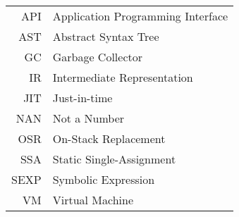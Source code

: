 \documentclass[english,master,oneside]{ctufit-thesis}
\begin{document}
\chapter{\thectufitabbreviationlabel}

\begin{tabular}{rl}
	API  & Application Programming Interface \\
	AST  & Abstract Syntax Tree              \\
	GC   & Garbage Collector                 \\
	IR   & Intermediate Representation       \\
	JIT  & Just-in-time                      \\
	NAN  & Not a Number                      \\
	OSR  & On-Stack Replacement              \\
	SSA  & Static Single-Assignment          \\
	SEXP & Symbolic Expression               \\
	VM   & Virtual Machine                   \\
\end{tabular}


\resumeTOCentries
\mainmatter\mainmatterinit %








\appendix\appendixinit %



\backmatter %

\printbibliography %
\end{document}
